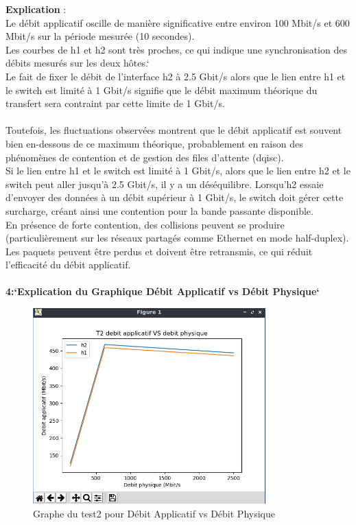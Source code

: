 \textbf{Explication} :\\
Le débit applicatif oscille de manière significative entre environ 100 Mbit/s et 600 Mbit/s sur la période mesurée (10 secondes).
\\

Les courbes de h1 et h2 sont très proches, ce qui indique une synchronisation des débits mesurés sur les deux hôtes.`\\
Le fait de fixer le débit de l'interface h2 à 2.5 Gbit/s alors que le lien entre h1 et le switch est limité à 1 Gbit/s signifie que le débit maximum théorique du transfert sera contraint par cette limite de 1 Gbit/s.
\\
\\Toutefois, les fluctuations observées montrent que le débit applicatif est souvent bien en-dessous de ce maximum théorique, probablement en raison des phénomènes de contention et de gestion des files d'attente (dqisc).
\vspace{0.5cm}
\\
Si le lien entre h1 et le switch est limité à 1 Gbit/s, alors que le lien entre h2 et le switch peut aller jusqu'à 2.5 Gbit/s, il y a un déséquilibre.
Lorsqu'h2 essaie d'envoyer des données à un débit supérieur à 1 Gbit/s, le switch doit gérer cette surcharge, créant ainsi une contention pour la bande passante disponible.
\\
En présence de forte contention, des collisions peuvent se produire (particulièrement sur les réseaux partagés comme Ethernet en mode half-duplex).
Les paquets peuvent être perdus et doivent être retransmis, ce qui réduit l'efficacité du débit applicatif.\\
\\
\textbf{4:`Explication du Graphique Débit Applicatif vs Débit Physique`}
\begin{figure}[H]
    \centering
    \includegraphics[width=0.8\textwidth]{./images/T1.2/T2appVSphy.png}
    \caption{Graphe du test2 pour Débit Applicatif vs Débit Physique}
    \label{fig:exemple}
\end{figure}
